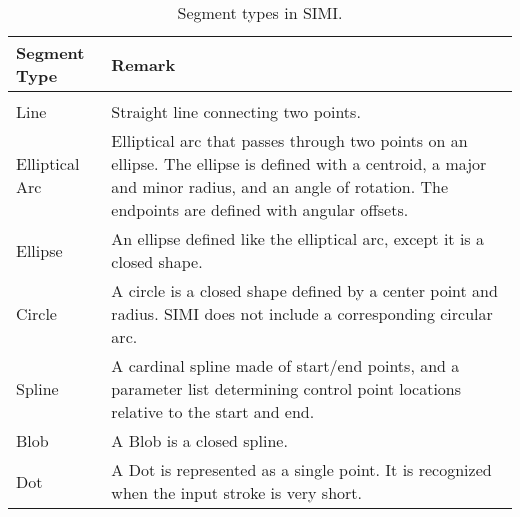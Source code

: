 
\begin{table}%
\centering
\begin{tabular}{l | p{12cm}}
\textbf{Segment Type} & \textbf{Remark} \\
\hline
\\

Line &

Straight line connecting two points.

\\

Elliptical Arc &

Elliptical arc that passes through two points on an ellipse. The
ellipse is defined with a centroid, a major and minor radius, and an
angle of rotation. The endpoints are defined with angular offsets.

\\

Ellipse &

An ellipse defined like the elliptical arc, except it is a closed
shape.  

\\ 

Circle &

A circle is a closed shape defined by a center point and radius. SIMI
does not include a corresponding circular arc.

\\ 

Spline &

A cardinal spline made of start/end points, and a parameter list
determining control point locations relative to the start and end.

\\ 

Blob &

A Blob is a closed spline.

\\ 

Dot &

A Dot is represented as a single point. It is recognized when the
input stroke is very short.

\\ \hline

\end{tabular}
\caption[Segment Types]{Segment types in SIMI.}
\label{tab:segment-types}
\end{table}

